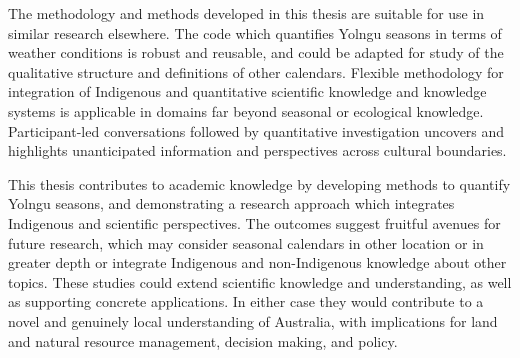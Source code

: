 The methodology and methods developed in this thesis are suitable for use in
similar research elsewhere.  The code which quantifies Yolngu seasons in terms of weather
conditions is robust and reusable, and could be adapted for study of the
qualitative structure and definitions of other calendars.
Flexible methodology for integration of Indigenous and quantitative
scientific knowledge and knowledge systems is applicable in domains far beyond
seasonal or ecological knowledge.  Participant-led conversations followed by
quantitative investigation uncovers and highlights unanticipated information
and perspectives across cultural boundaries.


This thesis contributes to academic knowledge by developing methods to
quantify Yolngu seasons, and demonstrating a research approach which
integrates Indigenous and scientific perspectives.
%
The outcomes suggest fruitful avenues for future research, which may consider seasonal calendars in
other location or in greater depth or integrate Indigenous and non-Indigenous
knowledge about other topics.  These studies could extend scientific knowledge
and understanding, as well as supporting concrete applications.  In either case
they would contribute to a novel and genuinely local understanding of
Australia, with implications for land and natural resource management,
decision making, and policy.


